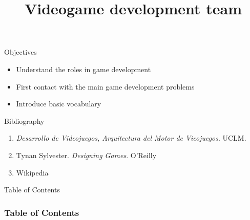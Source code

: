\documentclass[10pt,compress]{beamer} %
\title[Videogame development team]{Videogame development team}
\author{}
\institute{\asignatura}
\date{}
\begin{document}
{\titlepageBlue
    \begin{frame}
        \titlepage
    \end{frame}
}

\begin{frame}[plain]{}
   \begin{block}{Objectives}
   \begin{itemize}
        \item Understand the roles in game development
        \item First contact with the main game development problems
		\item Introduce basic vocabulary
	\end{itemize}
	\end{block}

   \begin{block}{Bibliography}
      \begin{enumerate}
          \item  \textit{Desarrollo de Videojuegos, Arquitectura del Motor de Vieojuegos}. UCLM.
          \item Tynan Sylvester. \textit{Designing Games}. O'Reilly
          \item Wikipedia
      \end{enumerate} 
   \end{block}
\end{frame}

{
\begin{frame}[shrink]{Table of Contents}
 \frametitle{Table of Contents}
 \tableofcontents
\end{frame}
}
\end{document}
